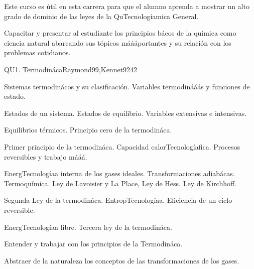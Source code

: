 \begin{syllabus}


\begin{justification}
Este curso es útil en esta carrera para que el alumno aprenda a mostrar un alto grado de dominio de las leyes de la QuTecnologíamica General.
\end{justification}

\begin{goals}
\item Capacitar y presentar al estudiante los principios bácos de la química como ciencia natural abarcando sus tópicos máááportantes y su relación con los problemas cotidianos.
\end{goals}

\begin{outcomes}
\end{outcomes}

\begin{unit}{}{QU1. Termodináca}{Raymond99,Kennet92}{4}{2}
\begin{topics}
      \item Sistemas termodinácos y su clasificación. Variables termodinááás y funciones de estado.
      \item Estados de un sistema. Estados de equilibrio. Variables extensivas e intensivas.
      \item Equilibrios térmicos. Principio cero de la termodináca.
      \item Primer principio de la termodináca. Capacidad calorTecnologíafica. Procesos reversibles y trabajo mááá.
      \item EnergTecnologíaa interna de los gases ideales. Transformaciones adiabácas. Termoquímica. Ley de Lavoisier y La Place, Ley de Hess. Ley de Kirchhoff.
      \item Segunda Ley de la termodináca. EntropTecnologíaa. Eficiencia de un ciclo reversible.
	\item EnergTecnologíaa libre. Tercera ley de la termodináca.
   \end{topics}

   \begin{learningoutcomes}
      \item Entender y trabajar con los principios de la Termodináca.
      \item Abstraer de la naturaleza los conceptos de las transformaciones de los gases.
   \end{learningoutcomes}
\end{unit}


\end{syllabus}
